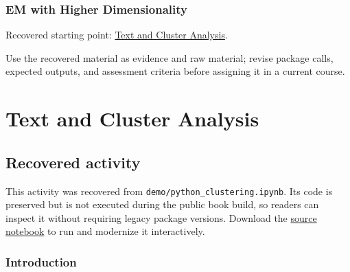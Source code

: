 \documentclass[
  letterpaper,
]{scrbook}
\begin{document}
\subsection*{EM with Higher
Dimensionality}\label{sec-pr-10-em-with-higher-dimensionality}

Recovered starting point: \hyperref[sec-lab-clustering]{Text and Cluster
Analysis}.

Use the recovered material as evidence and raw material; revise package
calls, expected outputs, and assessment criteria before assigning it in
a current course.

\chapter*{Text and Cluster Analysis}\label{ch-lab-clustering}


\section*{Recovered activity}\label{sec-lab-clustering}


\begin{tcolorbox}[enhanced jigsaw, arc=.35mm, bottomrule=.15mm, bottomtitle=1mm, breakable, colback=white, colbacktitle=quarto-callout-note-color!10!white, colframe=quarto-callout-note-color-frame, coltitle=black, left=2mm, leftrule=.75mm, opacityback=0, opacitybacktitle=0.6, rightrule=.15mm, title=\textcolor{quarto-callout-note-color}{\faInfo}\hspace{0.5em}{Historical source and execution note}, titlerule=0mm, toprule=.15mm, toptitle=1mm]

This activity was recovered from \texttt{demo/python\_clustering.ipynb}.
Its code is preserved but is not executed during the public book build,
so readers can inspect it without requiring legacy package versions.
Download the \href{../notebooks/clustering.ipynb}{source notebook} to
run and modernize it interactively.

\end{tcolorbox}

\subsection*{Introduction}\label{introduction}
\end{document}
